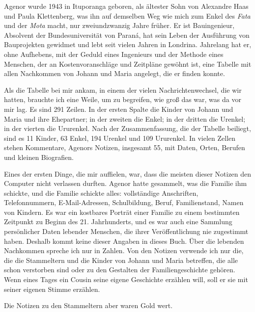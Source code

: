 \documentclass[
  ngerman,
  11pt,
  openany]{book}
\begin{document}
Agenor wurde 1943 in Ituporanga geboren, als ältester Sohn von Alexandre
Haas und Paula Klettenberg, was ihn auf demselben Weg wie mich zum Enkel
des \emph{Fata} und der \emph{Mota} macht, nur zweiundzwanzig Jahre
früher. Er ist Bauingenieur, Absolvent der Bundesuniversität von Paraná,
hat sein Leben der Ausführung von Bauprojekten gewidmet und lebt seit
vielen Jahren in Londrina. Jahrelang hat er, ohne Aufhebens, mit der
Geduld eines Ingenieurs und der Methode eines Menschen, der an
Kostenvoranschläge und Zeitpläne gewöhnt ist, eine Tabelle mit allen
Nachkommen von Johann und Maria angelegt, die er finden konnte.

Als die Tabelle bei mir ankam, in einem der vielen Nachrichtenwechsel,
die wir hatten, brauchte ich eine Weile, um zu begreifen, wie groß das
war, was da vor mir lag. Es sind 291 Zeilen. In der ersten Spalte die
Kinder von Johann und Maria und ihre Ehepartner; in der zweiten die
Enkel; in der dritten die Urenkel; in der vierten die Ururenkel. Nach
der Zusammenfassung, die der Tabelle beiliegt, sind es 11 Kinder, 63
Enkel, 194 Urenkel und 109 Ururenkel. In vielen Zellen stehen
Kommentare, Agenors Notizen, insgesamt 55, mit Daten, Orten, Berufen und
kleinen Biografien.

Eines der ersten Dinge, die mir auffielen, war, dass die meisten dieser
Notizen den Computer nicht verlassen durften. Agenor hatte gesammelt,
was die Familie ihm schickte, und die Familie schickte alles:
vollständige Anschriften, Telefonnummern, E-Mail-Adressen, Schulbildung,
Beruf, Familienstand, Namen von Kindern. Es war ein kostbares Porträt
einer Familie zu einem bestimmten Zeitpunkt zu Beginn des 21.
Jahrhunderts, und es war auch eine Sammlung persönlicher Daten lebender
Menschen, die ihrer Veröffentlichung nie zugestimmt haben. Deshalb kommt
keine dieser Angaben in dieses Buch. Über die lebenden Nachkommen
spreche ich nur in Zahlen. Von den Notizen verwende ich nur die, die die
Stammeltern und die Kinder von Johann und Maria betreffen, die alle
schon verstorben sind oder zu den Gestalten der Familiengeschichte
gehören. Wenn eines Tages ein Cousin seine eigene Geschichte erzählen
will, soll er sie mit seiner eigenen Stimme erzählen.

Die Notizen zu den Stammeltern aber waren Gold wert.
\end{document}
